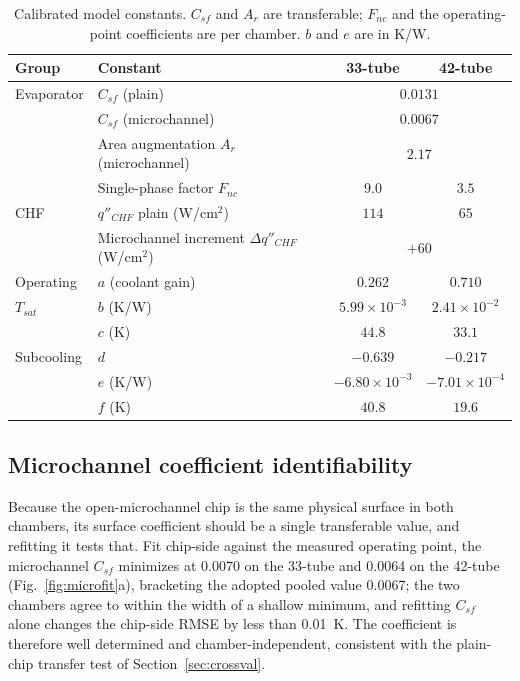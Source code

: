 \documentclass[11pt]{article}
\begin{document}
\begin{table}[H]
\centering
\caption{Calibrated model constants. $C_{sf}$ and $A_r$ are transferable; $F_{nc}$ and the
operating-point coefficients are per chamber. $b$ and $e$ are in K/W.}
\label{tab:params}
\begin{tabular}{llcc}
\toprule
Group & Constant & 33-tube & 42-tube\\
\midrule
Evaporator & $C_{sf}$ (plain) & \multicolumn{2}{c}{$0.0131$}\\
           & $C_{sf}$ (microchannel) & \multicolumn{2}{c}{$0.0067$}\\
           & Area augmentation $A_r$ (microchannel) & \multicolumn{2}{c}{$2.17$}\\
           & Single-phase factor $F_{nc}$ & $9.0$ & $3.5$\\
\midrule
CHF        & $q''_{CHF}$ plain (W/cm$^2$) & $114$ & $65$\\
           & Microchannel increment $\Delta q''_{CHF}$ (W/cm$^2$) & \multicolumn{2}{c}{$+60$}\\
\midrule
Operating  & $a$ (coolant gain) & $0.262$ & $0.710$\\
$T_{sat}$  & $b$ (K/W) & $5.99\times10^{-3}$ & $2.41\times10^{-2}$\\
           & $c$ (K) & $44.8$ & $33.1$\\
\midrule
Subcooling & $d$ & $-0.639$ & $-0.217$\\
           & $e$ (K/W) & $-6.80\times10^{-3}$ & $-7.01\times10^{-4}$\\
           & $f$ (K) & $40.8$ & $19.6$\\
\bottomrule
\end{tabular}
\end{table}

\subsection{Microchannel coefficient identifiability}
\label{sec:microfit}
Because the open-microchannel chip is the same physical surface in both chambers, its surface
coefficient should be a single transferable value, and refitting it tests that. Fit chip-side
against the measured operating point, the microchannel $C_{sf}$ minimizes at 0.0070 on the
33-tube and 0.0064 on the 42-tube (Fig.~\ref{fig:microfit}a), bracketing the adopted pooled
value 0.0067; the two chambers agree to within the width of a shallow minimum, and refitting
$C_{sf}$ alone changes the chip-side RMSE by less than 0.01~K. The coefficient is therefore well
determined and chamber-independent, consistent with the plain-chip transfer test of
Section~\ref{sec:crossval}.
\end{document}
